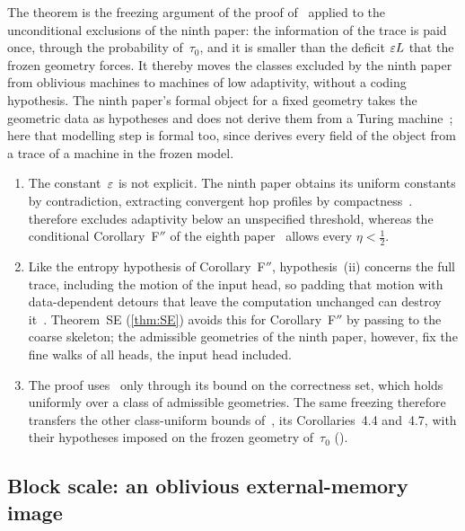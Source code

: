 The theorem is the freezing argument of the proof of~\cite[Corollary~6.4]{BoundedNesting2026} applied to the unconditional
exclusions of the ninth paper: the information of the trace is paid once, through the probability of~$\tau_0$, and it is
smaller than the deficit $\varepsilon L$ that the frozen geometry forces. It thereby moves the classes excluded by the ninth paper
from oblivious machines to machines of low adaptivity, without a coding hypothesis. The ninth paper's formal object for a
fixed geometry takes the geometric data as hypotheses and does not derive them from a Turing
machine~\cite[Section~2.1]{SourceCovers2026}; here that modelling step is formal too, since
 derives every field of the object from a trace of a machine in the frozen model.

\begin{remark}\label{rem:LA-scope}
\begin{enumerate}[label=(\arabic*)]
\item The constant~$\varepsilon$ is not explicit. The ninth paper obtains its uniform constants by contradiction, extracting
convergent hop profiles by compactness~\cite[Section~4.1]{SourceCovers2026}.  therefore excludes adaptivity
below an unspecified threshold, whereas the conditional Corollary~F$''$ of the eighth
paper~\cite[Corollary~6.4]{BoundedNesting2026} allows every $\eta<\frac12$.
\item Like the entropy hypothesis of Corollary~F$''$, hypothesis~(ii) concerns the full trace, including the motion of
the input head, so padding that motion with data-dependent detours that leave the computation unchanged can destroy
it~\cite[Section~6.2]{BoundedNesting2026}. Theorem~SE (\cref{thm:SE}) avoids this for Corollary~F$''$ by passing to the
coarse skeleton; the admissible geometries of the ninth paper, however, fix the fine walks of all heads, the input head
included.
\item The proof uses~\cite[Corollary~4.5]{SourceCovers2026} only through its bound on the correctness set, which holds
uniformly over a class of admissible geometries. The same freezing therefore transfers the other class-uniform bounds
of~\cite[Section~4]{SourceCovers2026}, its Corollaries~4.4 and~4.7, with their hypotheses imposed on the frozen geometry
of~$\tau_0$ ().
\end{enumerate}
\end{remark}

\subsection{Block scale: an oblivious external-memory image}\label{sec:reductions-EM}

